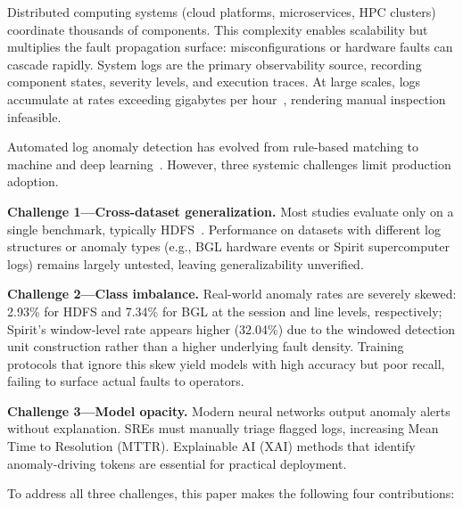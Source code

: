 \documentclass{elektr}
\begin{document}
Distributed computing systems (cloud platforms, microservices, HPC clusters)
coordinate thousands of components. This complexity enables scalability but
multiplies the fault propagation surface: misconfigurations or hardware faults
can cascade rapidly. System logs are the primary observability source, recording
component states, severity levels, and execution traces. At large scales, logs
accumulate at rates exceeding gigabytes per hour~\cite{ref13}, rendering manual
inspection infeasible.

Automated log anomaly detection has evolved from rule-based matching to
machine and deep learning~\cite{ref4,ref5}. However, three systemic
challenges limit production adoption.

\textbf{Challenge 1---Cross-dataset generalization.} Most studies evaluate only
on a single benchmark, typically HDFS~\cite{ref5,ref7,ref18}. Performance on
datasets with different log structures or anomaly types (e.g., BGL hardware
events or Spirit supercomputer logs) remains largely untested, leaving
generalizability unverified.

\textbf{Challenge 2---Class imbalance.} Real-world anomaly rates are severely
skewed: 2.93\% for HDFS and 7.34\% for BGL at the session and line levels,
respectively; Spirit's window-level rate appears higher (32.04\%) due to the
windowed detection unit construction rather than a higher underlying fault density.
Training protocols that ignore this skew yield models with high accuracy but poor
recall, failing to surface actual faults to operators.

\textbf{Challenge 3---Model opacity.} Modern neural networks output anomaly
alerts without explanation. SREs must manually triage flagged logs, increasing
Mean Time to Resolution (MTTR). Explainable AI (XAI) methods that identify
anomaly-driving tokens are essential for practical deployment.

To address all three challenges, this paper makes the following four contributions:
\end{document}
